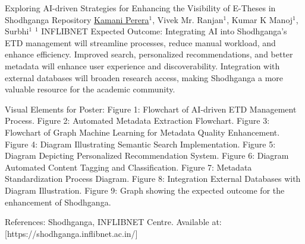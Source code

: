 \begin{abstract_online}{Exploring AI-driven Strategies for Enhancing the Visibility of E-Theses in Shodhganga Repository}{%
    \underline{Kamani Perera}$^{1}$, Vivek Mr. Ranjan$^{1}$, Kumar K Manoj$^{1}$, Surbhi$^{1}$}{%
    $^1$ INFLIBNET%
}
	Expected Outcome: Integrating AI into Shodhganga’s ETD management will streamline processes, reduce manual workload, and enhance efficiency. Improved search, personalized recommendations, and better metadata will enhance user experience and discoverability. Integration with external databases will broaden research access, making Shodhganga a more valuable resource for the academic community.

	Visual Elements for Poster:
Figure 1: Flowchart of AI-driven ETD Management Process.
Figure 2: Automated Metadata Extraction Flowchart.
Figure 3: Flowchart of Graph Machine Learning for Metadata Quality Enhancement.
Figure 4: Diagram Illustrating Semantic Search Implementation.
Figure 5: Diagram Depicting Personalized Recommendation System.
Figure 6: Diagram Automated Content Tagging and Classification.
Figure 7: Metadata Standardization Process Diagram.
Figure 8: Integration External Databases with Diagram Illustration.
Figure 9: Graph showing the expected outcome for the enhancement of Shodhganga.

	References: Shodhganga, INFLIBNET Centre. Available at: [https://shodhganga.inflibnet.ac.in/]

\end{abstract_online}

